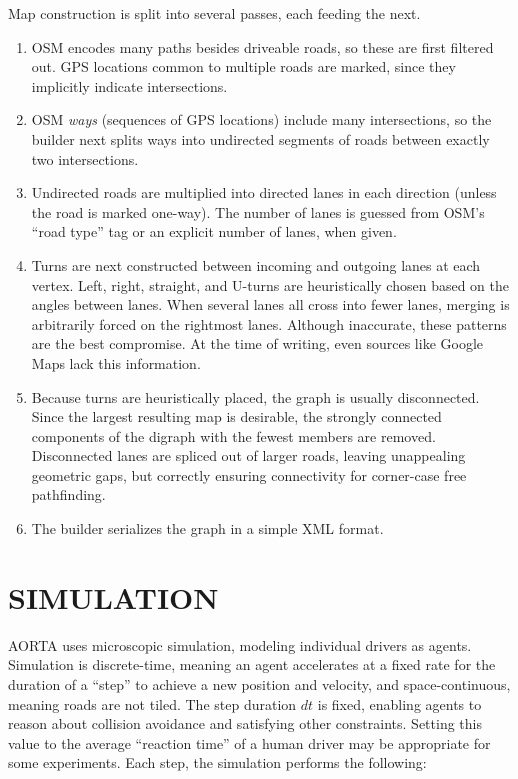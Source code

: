 \documentclass[letterpaper, 10 pt, conference]{ieeeconf}  %
\begin{document}
Map construction is split into several passes, each feeding the next.
\begin{enumerate}
  \item OSM encodes many paths besides driveable roads, so these are first
        filtered out. GPS locations common to multiple roads are marked, since
        they implicitly indicate intersections.
  \item OSM \emph{ways} (sequences of GPS locations) include many
        intersections, so the builder next splits ways into undirected
        segments of roads between exactly two intersections.
  \item Undirected roads are multiplied into directed lanes in each direction
        (unless the road is marked one-way). The number of lanes is guessed from
        OSM's ``road type'' tag or an explicit number of lanes, when given.
  \item Turns are next constructed between incoming and outgoing lanes at each
        vertex. Left, right, straight, and U-turns are heuristically chosen based on
        the angles between lanes. When several lanes all cross into fewer lanes,
        merging is arbitrarily forced on the rightmost lanes.  Although inaccurate,
        these patterns are the best compromise. At the time of writing, even sources
        like Google Maps  lack this information.
  \item Because turns are heuristically placed, the graph is usually
        disconnected. Since the largest resulting map is desirable, the strongly
        connected components of the digraph with the fewest members are removed.
        Disconnected lanes are spliced out of larger roads, leaving unappealing
        geometric gaps, but correctly ensuring connectivity for corner-case free
        pathfinding.
  \item The builder serializes the graph in a simple XML format.
\end{enumerate}


\section{SIMULATION}
\label{sec:simulation}

AORTA uses microscopic simulation, modeling individual drivers as agents.
Simulation is discrete-time, meaning an agent accelerates at a fixed rate for
the duration of a ``step'' to achieve a new position and velocity, and
space-continuous, meaning roads are not tiled. The step duration $dt$ is fixed,
enabling agents to reason about collision avoidance and satisfying other
constraints. Setting this value to the average ``reaction time'' of a human
driver may be appropriate for some experiments. Each step, the simulation
performs the following:
\end{document}
